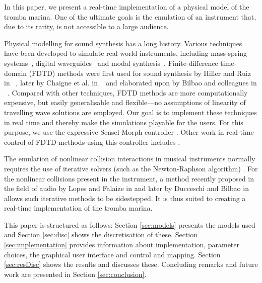     In this paper, we present a real-time implementation of a physical model of the tromba marina. One of the ultimate goals is the emulation of an instrument that, due to its rarity, is not accessible to a large audience.
    
    Physical modelling for sound synthesis has a long history. Various techniques have been developed to simulate real-world instruments, including mass-spring systems~\cite{cadoz79}, digital waveguides~\cite{smith1992physical} and modal synthesis~\cite{morrison1993mosaic}.
    Finite-difference time-domain (FDTD) methods were first used for sound synthesis by Hiller and Ruiz in ~\cite{Ruiz1969, Hiller1971, Hiller2}, later by Chaigne et al. in ~\cite{Chaigne92, Chaigne} and elaborated upon by Bilbao and colleagues in ~\cite{bilbao2009numerical, Bilbao2018:Tutorial}. Compared with other techniques, FDTD methods are more computationally expensive, but easily generalisable and flexible---no assumptions of linearity of travelling wave solutions are employed. Our goal is to implement these techniques in real time and thereby make the simulations playable for the users. For this purpose, we use the expressive Sensel Morph controller \cite{sensel2020}. Other work in real-time control of FDTD methods using this controller includes \cite{Willemsen2019a:SMC2020}. 
    
    The emulation of nonlinear collision interactions in musical instruments normally requires the use of iterative solvers (such as the Newton-Raphson algorithm) \cite{Bilbao15}. For the nonlinear collisions present in the instrument, a method recently proposed in the field of audio by Lopes and Falaize in \cite{Lopes:SMC2020, Falaize2016a:SMC2020, Falaize2016b:SMC2020} and later by Ducceschi and Bilbao in~\cite{Ducceschi2019} allows such iterative methods to be sidestepped. It is thus suited  to creating a real-time implementation of the tromba marina.
    
    This paper is structured as follows: Section \ref{sec:models} presents the models used and Section \ref{sec:disc} shows the discretisation of these. Section \ref{sec:implementation} provides information about implementation, parameter choices, the graphical user interface and control and mapping. Section \ref{sec:resDisc} shows the results and discusses these. Concluding remarks and future work are presented in Section \ref{sec:conclusion}.
    
